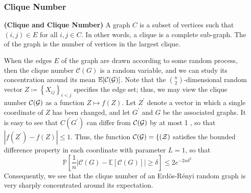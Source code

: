 \documentclass{article}
\newcommand{\bfs}[1]{\textbf{({#1})}}
\begin{document}
\subsubsection{Clique Number}
\begin{defa}{\bfs{Clique and Clique Number}}
A graph  $C$ is a subset of vertices such that $(i, j) \in E$ for all $i, j \in C$. In other words, a clique is a  complete sub-graph. The   of the graph is the  number of vertices in the largest clique. 
\end{defa}
When the edges $E$ of the graph are drawn according to some random process, then the clique number $\mathcal{C}(G)$ is a random variable, and we can study its concentration around its mean $\mathbb{E}[\cal{C}(G)]$. Note that the $\binom{n}{2}$-dimensional random vector $Z\coloneqq\left\{X_{i j}\right\}_{i<j}$ specifies the edge set; thus, we may view the clique number $\cal{C}(G)$  as a function $Z \mapsto f(Z) .$ Let $Z^{\prime}$ denote a vector in which a single coordinate of $Z$ has been changed, and let $G^{\prime}$ and $G$ be the associated graphs. It is easy to see that $C\left(G^{\prime}\right)$ can differ from $\cal{C}(G)$  by at most 1 , so that $\left|f\left(Z^{\prime}\right)-f(Z)\right| \leq 1$. Thus, the function $\cal{C}(G)=f(Z)$ satisfies the bounded difference property in each coordinate with parameter $L=1$, so that
$$
\mathbb{P}\left[\frac{1}{n}|\mathcal{C}(G)-\mathbb{E}[\mathcal{C}(G)]| \geq \delta\right] \leq 2 e^{-2 n \delta^{2}}
$$
Consequently, we see that the clique number of an Erd\"{o}s-R\'{e}nyi random graph is very sharply concentrated around its expectation.
\end{document}
